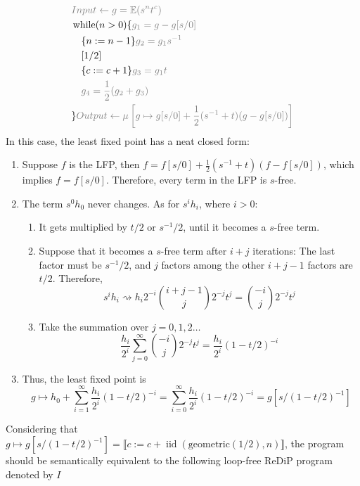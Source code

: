 \documentclass[a4paper]{article}
\DeclareMathOperator*{\iid}{iid}
\renewcommand{\S}[1]{ \llbracket #1 \rrbracket }
\newcommand{\E}{ \mathbb{E} }
\newcommand{\Geom}{\mathrm{geometric}}
\newcommand{\Anno}[1]{\color{gray}{#1}}
\begin{document}
\begin{align*}
	 & \Anno{Input \gets g = \E(s^n t^c)}                                                          \\
	 & \operatorname{while} (n>0) \{  \Anno{g_1 = g - g[s/0] }                                     \\
	 & \quad \{ n := n - 1 \} \Anno{g_2 = g_1 s^{-1}}                                              \\
	 & \quad [1/2]                                                                                 \\
	 & \quad \{ c := c + 1 \} \Anno{g_3 = g_1 t}                                                   \\
	 & \quad \Anno{g_4 = \frac12 (g_2 + g_3)}                                                      \\
	 & \} \Anno{Output \gets \mu \left[ g \mapsto g[s/0] + \frac12(s^{-1} + t)(g-g[s/0]) \right] } \\
\end{align*}
In this case, the least fixed point has a neat closed form:
\begin{enumerate}
	\item Suppose \(f\) is the LFP, then \( f = f[s/0] + \frac12(s^{-1} + t)(f-f[s/0]) \), which implies \(f = f[s/0]\). Therefore, every term in the LFP is \(s\)-free.
	\item The term \(s^0 h_0\) never changes. As for \(s^i h_i\), where \(i>0\):
	      \begin{enumerate}
		      \item It gets multiplied by \(t/2\) or \(s^{-1}/2\), until it becomes a \(s\)-free term.
		      \item Suppose that it becomes a \(s\)-free term after \(i+j\) iterations:
		            The last factor must be \(s^{-1}/2\), and \(j\) factors among the other \(i+j-1\) factors are \(t/2\).
		            Therefore,
		            \[
			            s^i h_i \rightsquigarrow h_i 2^{-i} \binom{i+j-1}{j} 2^{-j}t^j = \binom{-i}{j}2^{-j} t^j
		            \]
		      \item Take the summation over \(j=0,1,2\ldots\)
		            \[
			            \frac{h_i}{2^i} \sum_{j=0}^\infty \binom{-i}{j} 2^{-j}t^j
			            = \frac{h_i}{2^i} {(1-t/2)}^{-i}
		            \]
	      \end{enumerate}
	\item Thus, the least fixed point is
	      \[
		      g\mapsto h_0 + \sum_{i=1}^\infty \frac{h_i}{2^i} {(1-t/2)}^{-i}
		      = \sum_{i=0}^\infty \frac{h_i}{2^i} {(1-t/2)}^{-i}
		      = g[s/{(1-t/2)}^{-1}]
	      \]
\end{enumerate}
Considering that \(g\mapsto g[s/{(1-t/2)}^{-1}] = \S{c := c + \iid(\Geom(1/2),n)}\),
the program should be semantically equivalent to the following loop-free ReDiP program denoted by \(I\)
\end{document}
